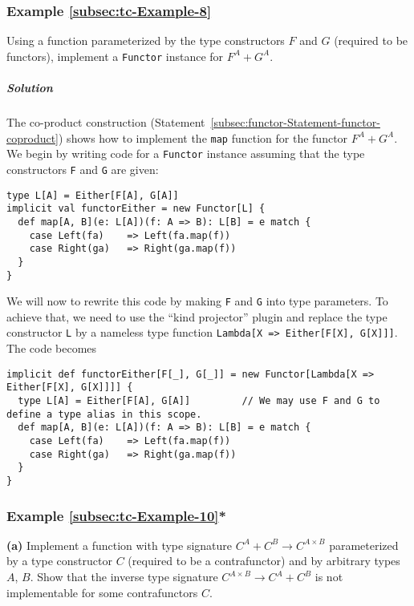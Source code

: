 \subsubsection{Example \label{subsec:tc-Example-8}\ref{subsec:tc-Example-8}}

Using a function parameterized by the type constructors $F$ and $G$
(required to be functors), implement a \lstinline!Functor! instance
for $F^{A}+G^{A}$.

\subparagraph{Solution}

The co-product construction (Statement~\ref{subsec:functor-Statement-functor-coproduct})
shows how to implement the \lstinline!map! function for the functor
$F^{A}+G^{A}$. We begin by writing code for a \lstinline!Functor!
instance assuming that the type constructors \lstinline!F! and \lstinline!G!
are given:
\begin{lstlisting}
type L[A] = Either[F[A], G[A]]
implicit val functorEither = new Functor[L] {
  def map[A, B](e: L[A])(f: A => B): L[B] = e match {
    case Left(fa)    => Left(fa.map(f))
    case Right(ga)   => Right(ga.map(f))
  }
}
\end{lstlisting}
We will now to rewrite this code by making \lstinline!F! and \lstinline!G!
into type parameters. To achieve that, we need to use the ``kind
projector'' plugin and replace
the type constructor \lstinline!L! by a nameless type function \lstinline!Lambda[X => Either[F[X], G[X]]]!.
The code becomes
\begin{lstlisting}
implicit def functorEither[F[_], G[_]] = new Functor[Lambda[X => Either[F[X], G[X]]]] {
  type L[A] = Either[F[A], G[A]]         // We may use F and G to define a type alias in this scope.
  def map[A, B](e: L[A])(f: A => B): L[B] = e match {
    case Left(fa)    => Left(fa.map(f))
    case Right(ga)   => Right(ga.map(f))
  }
}
\end{lstlisting}


\subsubsection{Example \label{subsec:tc-Example-10}\ref{subsec:tc-Example-10}{*}}

\textbf{(a)} Implement a function with type signature $C^{A}+C^{B}\rightarrow C^{A\times B}$
parameterized by a type constructor $C$ (required to be a contrafunctor)
and by arbitrary types $A$, $B$. Show that the inverse type signature
$C^{A\times B}\rightarrow C^{A}+C^{B}$ is not implementable for some
contrafunctors $C$.

